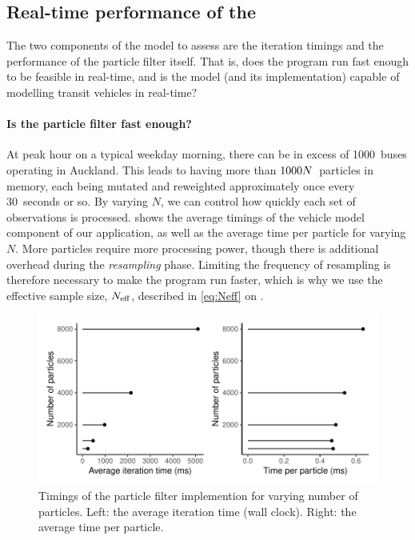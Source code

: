 \subsection{Real-time performance of the \pf{}}
\label{sec:pf_issues}



The two components of the model to assess are the iteration timings and the performance of the particle filter itself. That is, does the program run fast enough to be feasible in real-time, and is the model (and its \pf{} implementation) capable of modelling transit vehicles in real-time?


\paragraph{Is the particle filter fast enough?}
At peak hour on a typical weekday morning, there can be in excess of 1000~buses operating in Auckland. This leads to having more than $1000N$~particles in memory, each being mutated and reweighted approximately once every 30~seconds or so. By varying $N$, we can control how quickly each set of observations is processed.  shows the average timings of the vehicle model component of our application, as well as the average time per particle for varying $N$. More particles require more processing power, though there is additional overhead during the \emph{resampling} phase. Limiting the frequency of resampling is therefore necessary to make the program run faster, which is why we use the effective sample size, $N_\text{eff}$, described in \cref{eq:Neff} on .


\begin{knitrout}\small
{}\color{fgcolor}\begin{figure}

{\centering \includegraphics[width=.8\textwidth]{figure/pf_timings-1} 

}

\caption[Timings of the particle filter implemention for varying number of particles]{Timings of the particle filter implemention for varying number of particles. Left: the average iteration time (wall clock). Right: the average time per particle.}\label{fig:pf_timings}
\end{figure}


\end{knitrout}


